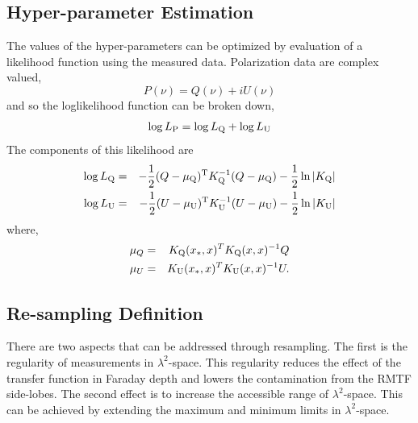 \documentclass[fleqn,usenatbib]{mnras}
\begin{document}
\subsection{Hyper-parameter Estimation}
\label{sec:parms}

The values of the hyper-parameters can be optimized by evaluation of a likelihood function using the measured data. Polarization data are complex valued, 
%
\begin{equation}
P(\nu) = Q(\nu) + iU(\nu)
\end{equation}
%
and so the loglikelihood function can be broken down,
%
\begin{equation}
\log L_{\rm P} = \log L_{\rm Q} + \log L_{\rm U}
\end{equation}
%
The components of this likelihood are
%
\begin{eqnarray}
\log L_{\rm Q} &=& -\frac{1}{2}(Q - \mu_{\rm Q})^{\rm T}K_{\rm Q}^{-1}(Q - \mu_{\rm Q}) - \frac{1}{2}\ln |K_{\rm Q}|\\
\log L_{\rm U} &=& -\frac{1}{2}(U - \mu_{\rm U})^{\rm T}K_{\rm U}^{-1}(U - \mu_{\rm U}) - \frac{1}{2}\ln |K_{\rm U}|
\end{eqnarray}
%
where,
%
\begin{eqnarray}
\mu_{Q} &=& K_{\rm Q}(x_{\ast},x)^T K_{\rm Q}(x,x)^{-1} Q\\
\mu_{U} &=& K_{\rm U}(x_{\ast},x)^T K_{\rm U}(x,x)^{-1} U. 
\end{eqnarray}
%


\subsection{Re-sampling Definition}
\label{sec:resamp}

There are two aspects that can be addressed through resampling. The first is the regularity of measurements in $\lambda^2$-space. This regularity reduces the effect of the transfer function in Faraday depth and lowers the contamination from the RMTF side-lobes. The second effect is to increase the accessible range of $\lambda^2$-space. This can be achieved by extending the maximum and minimum limits in $\lambda^2$-space. 
\end{document}
